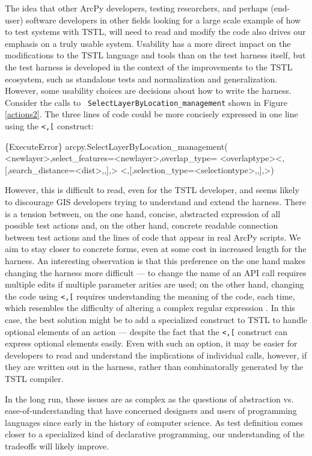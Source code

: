 The idea that other ArcPy developers, testing researchers, and perhaps
(end-user) software developers in other fields looking for a large
scale example of how to test systems with TSTL, will need to read and
modify the code also drives our emphasis on a truly usable system.
Usability has a more direct impact on the modifications to the TSTL
language and tools than on the test harness itself, but the test
harness is developed in the context of the improvements to the TSTL
ecosystem, such as standalone tests and normalization and
generalization.  However, some usability choices are decisions about
how to write the harness.  Consider the calls to {\tt
  SelectLayerByLocation\_management} shown in Figure \ref{actions2}.
The three lines of code could be more concisely expressed in one line using the {\tt <,[} construct:

\begin{code}
\{ExecuteError\} arcpy.SelectLayerByLocation\_management(
   <newlayer>,select\_features=<newlayer>,overlap\_type=
   <overlaptype><,[,search\_distance=<dist>,,],>
   <,[,selection\_type=<selectiontype>,,],>)
\end{code}

However, this is difficult to read, even for the TSTL developer, and
seems likely to discourage GIS developers trying to understand and
extend the harness.  There is a tension between, on the one hand, concise, abstracted
expression of all possible test actions and, on the other hand,
concrete readable connection between test actions and the lines of code that
appear in real ArcPy scripts.  We aim to stay closer to concrete
forms, even at some cost in increased length for the harness.  An
interesting observation is that this preference on the one hand makes
changing the harness more difficult --- to change the name of an API
call requires multiple edits if multiple parameter arities are used;
on the other hand, changing the code using {\tt <,[} requires
understanding the meaning of the code, each time, which resembles the
difficulty of altering a complex regular expression \cite{RegExp}.  In
this case, the best solution might be to add a specialized construct
to TSTL to handle optional elements of an action --- despite the fact
that the {\tt <,[} construct can express optional elements easily.
Even with such an option, it may be easier for developers to read and
understand the implications of individual calls, however, if they are
written out in the harness, rather than combinatorally generated by
the TSTL compiler.

In the long run, these issues are as complex as the questions of
abstraction vs. ease-of-understanding that have concerned designers
and users of programming languages since early in the history of
computer science.  As test definition comes closer to a specialized
kind of declarative programming, our understanding of the tradeoffs
will likely improve.